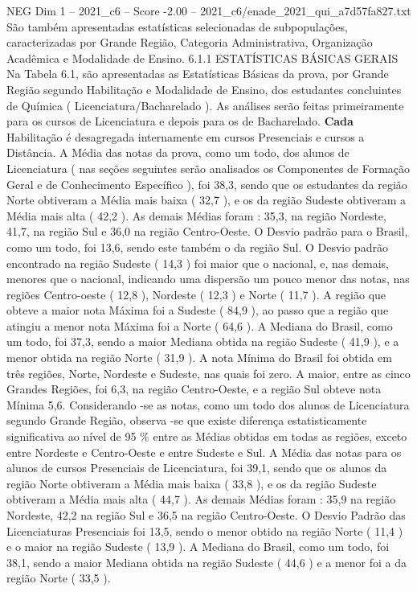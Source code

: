 \begin{textsample}{NEG Dim 1 – 2021\_c6 – Score -2.00 – 2021\_c6/enade\_2021\_qui\_a7d57fa827.txt}
São também apresentadas estatísticas selecionadas de subpopulações, caracterizadas por Grande Região, Categoria Administrativa, Organização Acadêmica e Modalidade de Ensino. 6.1.1 ESTATÍSTICAS BÁSICAS GERAIS Na Tabela 6.1, são apresentadas as Estatísticas Básicas da prova, por Grande Região segundo Habilitação e Modalidade de Ensino, dos estudantes concluintes de Química ( Licenciatura/Bacharelado ).
As análises serão feitas primeiramente para os cursos de Licenciatura e depois para os de Bacharelado. \textbf{Cada} Habilitação é desagregada internamente em cursos Presenciais e cursos a Distância.
A Média das notas da prova, como um todo, dos alunos de Licenciatura ( nas seções seguintes serão analisados os Componentes de Formação Geral e de Conhecimento Específico ), foi 38,3, sendo que os estudantes da região Norte obtiveram a Média mais baixa ( 32,7 ), e os da região Sudeste obtiveram a Média mais alta ( 42,2 ).
As demais Médias foram : 35,3, na região Nordeste, 41,7, na região Sul e 36,0 na região Centro-Oeste.
O Desvio padrão para o Brasil, como um todo, foi 13,6, sendo este também o da região Sul.
O Desvio padrão encontrado na região Sudeste ( 14,3 ) foi maior que o nacional, e, nas demais, menores que o nacional, indicando uma dispersão um pouco menor das notas, nas regiões Centro-oeste ( 12,8 ), Nordeste ( 12,3 ) e Norte ( 11,7 ).
A região que obteve a maior nota Máxima foi a Sudeste ( 84,9 ), ao passo que a região que atingiu a menor nota Máxima foi a Norte ( 64,6 ).
A Mediana do Brasil, como um todo, foi 37,3, sendo a maior Mediana obtida na região Sudeste ( 41,9 ), e a menor obtida na região Norte ( 31,9 ).
A nota Mínima do Brasil foi obtida em três regiões, Norte, Nordeste e Sudeste, nas quais foi zero.
A maior, entre as cinco Grandes Regiões, foi 6,3, na região Centro-Oeste, e a região Sul obteve nota Mínima 5,6.
Considerando -se as notas, como um todo dos alunos de Licenciatura segundo Grande Região, observa -se que existe diferença estatisticamente significativa ao nível de 95 \% entre as Médias obtidas em todas as regiões, exceto entre Nordeste e Centro-Oeste e entre Sudeste e Sul.
A Média das notas para os alunos de cursos Presenciais de Licenciatura, foi 39,1, sendo que os alunos da região Norte obtiveram a Média mais baixa ( 33,8 ), e os da região Sudeste obtiveram a Média mais alta ( 44,7 ).
As demais Médias foram : 35,9 na região Nordeste, 42,2 na região Sul e 36,5 na região Centro-Oeste.
O Desvio Padrão das Licenciaturas Presenciais foi 13,5, sendo o menor obtido na região Norte ( 11,4 ) e o maior na região Sudeste ( 13,9 ).
A Mediana do Brasil, como um todo, foi 38,1, sendo a maior Mediana obtida na região Sudeste ( 44,6 ) e a menor foi a da região Norte ( 33,5 ).

\end{textsample}
